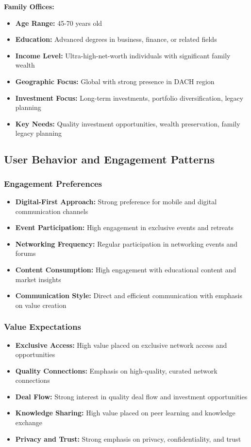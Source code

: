 \textbf{Family Offices:}
\begin{itemize}
    \item \textbf{Age Range:} 45-70 years old
    \item \textbf{Education:} Advanced degrees in business, finance, or related fields
    \item \textbf{Income Level:} Ultra-high-net-worth individuals with significant family wealth
    \item \textbf{Geographic Focus:} Global with strong presence in DACH region
    \item \textbf{Investment Focus:} Long-term investments, portfolio diversification, legacy planning
    \item \textbf{Key Needs:} Quality investment opportunities, wealth preservation, family legacy planning
\end{itemize}

\subsection{User Behavior and Engagement Patterns}

\subsubsection{Engagement Preferences}
\begin{itemize}
    \item \textbf{Digital-First Approach:} Strong preference for mobile and digital communication channels
    \item \textbf{Event Participation:} High engagement in exclusive events and retreats
    \item \textbf{Networking Frequency:} Regular participation in networking events and forums
    \item \textbf{Content Consumption:} High engagement with educational content and market insights
    \item \textbf{Communication Style:} Direct and efficient communication with emphasis on value creation
\end{itemize}

\subsubsection{Value Expectations}
\begin{itemize}
    \item \textbf{Exclusive Access:} High value placed on exclusive network access and opportunities
    \item \textbf{Quality Connections:} Emphasis on high-quality, curated network connections
    \item \textbf{Deal Flow:} Strong interest in quality deal flow and investment opportunities
    \item \textbf{Knowledge Sharing:} High value placed on peer learning and knowledge exchange
    \item \textbf{Privacy and Trust:} Strong emphasis on privacy, confidentiality, and trust
\end{itemize}

